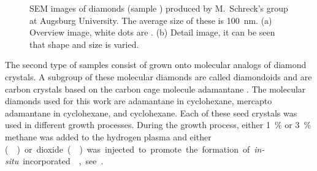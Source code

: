 	\begin{figure}[!htb]
		\begin{subfigure}[t]{ 0.49\linewidth}
			\caption{}\label{subfig::cvd_large}
			\centering
		\end{subfigure}
		\hfill
		\begin{subfigure}[t]{ 0.49\linewidth}
			\caption{}\label{subfig::cvd_detail}
			\centering
		\end{subfigure}
		\caption[Example of \CVD \nds]{SEM images of \CVD diamonds (sample \insitucvd) produced by M.\ Schreck's group at Augsburg University. The average size of these \nds is \SI{100}{nm}. (a) Overview image, white dots are \nds. (b) Detail image, it can be seen that \nd shape and size is varied.}
		\label{fig::sem_cvd}
	\end{figure}

	The second type of samples consist of \CVD \nds grown onto molecular analogs of diamond crystals.
	A subgroup of these molecular diamonds are called diamondoids and are carbon crystals based on the carbon cage molecule adamantane .
	The molecular diamonds used for this work are adamantane in cyclohexane, mercapto adamantane in cyclohexane, and cyclohexane.
	Each of these seed crystals was used in different growth processes.
	During the growth process, either \SI{1}{\percent} or \SI{3}{\percent} methane was added to the hydrogen plasma and either \si () or \si dioxide () was injected to promote the formation of \textit{in-situ} incorporated \sivs, see .



